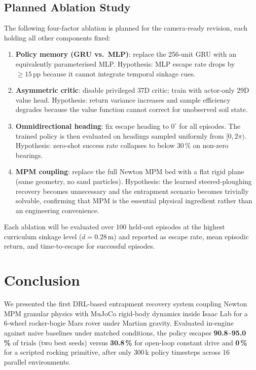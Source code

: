 \documentclass[conference]{IEEEtran}
\begin{document}
\subsection{Planned Ablation Study}
\label{sec:ablation}

The following four-factor ablation is planned for the camera-ready revision,
each holding all other components fixed:

\begin{enumerate}
  \item \textbf{Policy memory (GRU vs.\ MLP)}: replace the 256-unit GRU with an
        equivalently parameterised MLP.  Hypothesis: MLP escape rate drops by
        ${\geq}15$\,pp because it cannot integrate temporal sinkage cues.
  \item \textbf{Asymmetric critic}: disable privileged 37D critic; train with
        actor-only 29D value head.  Hypothesis: return variance increases and
        sample efficiency degrades because the value function cannot correct for
        unobserved soil state.
  \item \textbf{Omnidirectional heading}: fix escape heading to $0^\circ$ for all
        episodes.  The trained policy is then evaluated on headings sampled
        uniformly from $[0,2\pi)$.  Hypothesis: zero-shot success rate collapses
        to below $30$\,\% on non-zero bearings.
  \item \textbf{MPM coupling}: replace the full Newton MPM bed with a flat rigid
        plane (same geometry, no sand particles).  Hypothesis: the learned
        steered-ploughing recovery becomes unnecessary and the entrapment scenario
        becomes trivially solvable, confirming that MPM is the essential physical
        ingredient rather than an engineering convenience.
\end{enumerate}

Each ablation will be evaluated over 100 held-out episodes at the highest
curriculum sinkage level ($d=0.28$\,m) and reported as escape rate, mean
episodic return, and time-to-escape for successful episodes.

\section{Conclusion}
\label{sec:conclusion}

We presented the first DRL-based entrapment recovery system coupling Newton MPM
granular physics with MuJoCo rigid-body dynamics inside Isaac Lab for a
6-wheel rocker-bogie Mars rover under Martian gravity. Evaluated in-engine
against naive baselines under matched conditions, the policy escapes
\textbf{90.8--95.0\,\%} of trials (two best seeds) versus \textbf{30.8\,\%} for
open-loop constant drive and \textbf{0\,\%} for a scripted rocking primitive,
after only 300\,k policy timesteps across 16 parallel environments.
\end{document}
